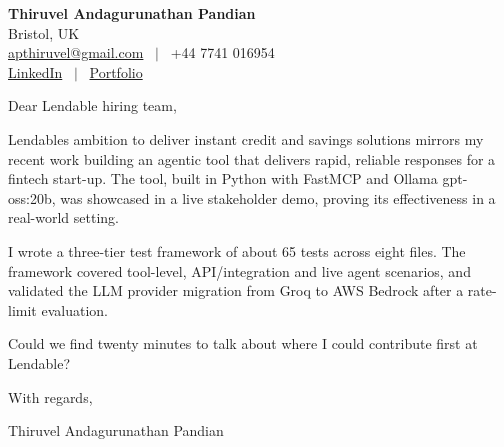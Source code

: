 \documentclass[11pt,a4paper]{article}
\begin{document}
\raggedright
\pagestyle{empty}

\begin{center}
    {\LARGE \color{linkblue} \textbf{Thiruvel Andagurunathan Pandian}}\\[0.2cm]
    Bristol, UK \\
    \href{mailto:apthiruvel@gmail.com}{apthiruvel@gmail.com} \ $|$ \ +44 7741 016954 \\
\href{https://www.linkedin.com/in/thiruvel-a-p/}{LinkedIn} \ $|$ \ \href{https://thiruvel-ap.github.io/PersonalPortfolio/}{Portfolio}
\end{center}

\vspace{0.4cm}

\noindent
Dear Lendable hiring team,

Lendable\textquotesingle{}s ambition to deliver instant credit and savings solutions mirrors my recent work building an agentic tool that delivers rapid, reliable responses for a fintech start-up.  The tool, built in Python with FastMCP and Ollama gpt-oss:20b, was showcased in a live stakeholder demo, proving its effectiveness in a real-world setting.

I wrote a three-tier test framework of about 65 tests across eight files.  The framework covered tool-level, API/integration and live agent scenarios, and validated the LLM provider migration from Groq to AWS Bedrock after a rate-limit evaluation.

Could we find twenty minutes to talk about where I could contribute first at Lendable?

\vspace{0.5cm}

With regards,

Thiruvel Andagurunathan Pandian
\end{document}
